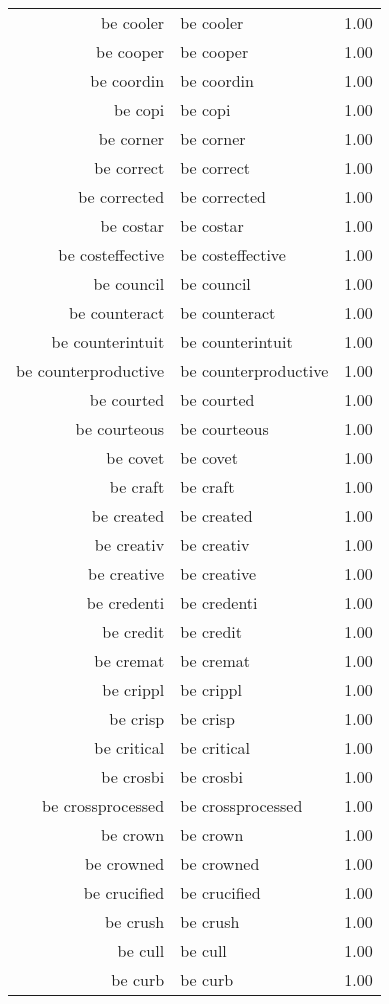 \begin{table}[ht]
\begin{tabular}{rlr}
  be cooler & be cooler & 1.00 \\ 
  be cooper & be cooper & 1.00 \\ 
  be coordin & be coordin & 1.00 \\ 
  be copi & be copi & 1.00 \\ 
  be corner & be corner & 1.00 \\ 
  be correct & be correct & 1.00 \\ 
  be corrected & be corrected & 1.00 \\ 
  be costar & be costar & 1.00 \\ 
  be costeffective & be costeffective & 1.00 \\ 
  be council & be council & 1.00 \\ 
  be counteract & be counteract & 1.00 \\ 
  be counterintuit & be counterintuit & 1.00 \\ 
  be counterproductive & be counterproductive & 1.00 \\ 
  be courted & be courted & 1.00 \\ 
  be courteous & be courteous & 1.00 \\ 
  be covet & be covet & 1.00 \\ 
  be craft & be craft & 1.00 \\ 
  be created & be created & 1.00 \\ 
  be creativ & be creativ & 1.00 \\ 
  be creative & be creative & 1.00 \\ 
  be credenti & be credenti & 1.00 \\ 
  be credit & be credit & 1.00 \\ 
  be cremat & be cremat & 1.00 \\ 
  be crippl & be crippl & 1.00 \\ 
  be crisp & be crisp & 1.00 \\ 
  be critical & be critical & 1.00 \\ 
  be crosbi & be crosbi & 1.00 \\ 
  be crossprocessed & be crossprocessed & 1.00 \\ 
  be crown & be crown & 1.00 \\ 
  be crowned & be crowned & 1.00 \\ 
  be crucified & be crucified & 1.00 \\ 
  be crush & be crush & 1.00 \\ 
  be cull & be cull & 1.00 \\ 
  be curb & be curb & 1.00 \\ 

\end{tabular}
\end{table}
